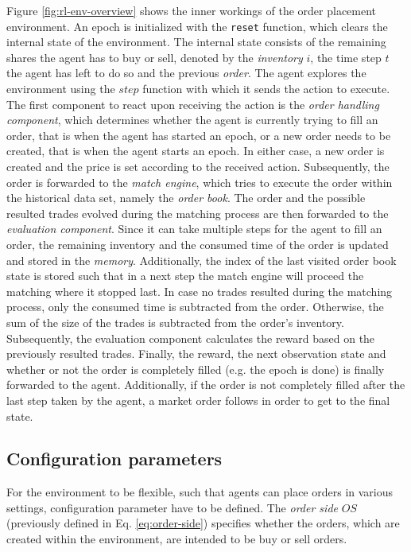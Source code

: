 Figure \ref{fig:rl-env-overview} shows the inner workings of the order placement environment.
An epoch is initialized with the \texttt{reset} function, which clears the internal state of the environment.
The internal state consists of the remaining shares the agent has to buy or sell, denoted by the \textit{inventory} $i$, the time step $t$ the agent has left to do so and the previous \textit{order}.
The agent explores the environment using the $step$ function with which it sends the action to execute.
The first component to react upon receiving the action is the \textit{order handling component}, which determines whether the agent is currently trying to fill an order, that is when the agent has started an epoch, or a new order needs to be created, that is when the agent starts an epoch.
In either case, a new order is created and the price is set according to the received action.
Subsequently, the order is forwarded to the \textit{match engine}, which tries to execute the order within the historical data set, namely the \textit{order book}.
The order and the possible resulted trades evolved during the matching process are then forwarded to the \textit{evaluation component}.
Since it can take multiple steps for the agent to fill an order, the remaining inventory and the consumed time of the order is updated and stored in the \textit{memory}.
Additionally, the index of the last visited order book state is stored such that in a next step the match engine will proceed the matching where it stopped last.
In case no trades resulted during the matching process, only the consumed time is subtracted from the order.
Otherwise, the sum of the size of the trades is subtracted from the order's inventory.
Subsequently, the evaluation component calculates the reward based on the previously resulted trades.
Finally, the reward, the next observation state and whether or not the order is completely filled (e.g. the epoch is done) is finally forwarded to the agent.
Additionally, if the order is not completely filled after the last step taken by the agent, a market order follows in order to get to the final state.

\subsection{Configuration parameters}

For the environment to be flexible, such that agents can place orders in various settings, configuration parameter have to be defined.
The \textit{order side} $OS$ (previously defined in Eq. \ref{eq:order-side}) specifies whether the orders, which are created within the environment, are intended to be buy or sell orders.

